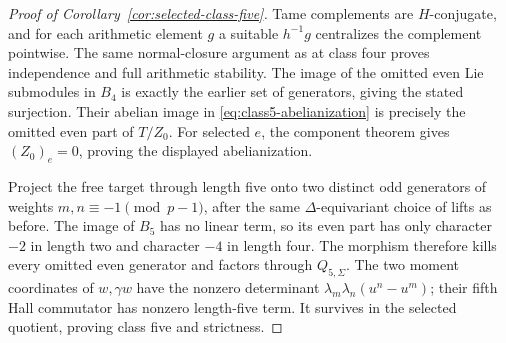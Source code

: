 \begin{proof}[Proof of Corollary~\ref{cor:selected-class-five}]
Tame complements are $H$-conjugate, and for each
arithmetic element $g$ a suitable $h^{-1}g$ centralizes
the complement pointwise. The same normal-closure
argument as at class four proves independence and
full arithmetic stability. The image of the omitted
even Lie submodules in $B_4$ is exactly the earlier
set of generators, giving the stated surjection.
Their abelian image in \eqref{eq:class5-abelianization}
is precisely the omitted even part of $T/Z_0$.
For selected $e$, the component theorem gives
$(Z_0)_e=0$, proving the displayed abelianization.

Project the free target through length five
onto two distinct odd generators of weights
$m,n\equiv-1\pmod{p-1}$, after the same
$\Delta$-equivariant choice of lifts as before.
The image of $B_5$ has no linear term, so its even
part has only character $-2$ in length two and
character $-4$ in length four. The morphism therefore
kills every omitted even generator and factors
through $Q_{5,\Sigma}$. The two moment coordinates
of $w,\gamma w$ have the nonzero determinant
$\lambda_m\lambda_n(u^n-u^m)$; their fifth Hall
commutator has nonzero length-five term. It survives
in the selected quotient, proving class five and
strictness.
\end{proof}

